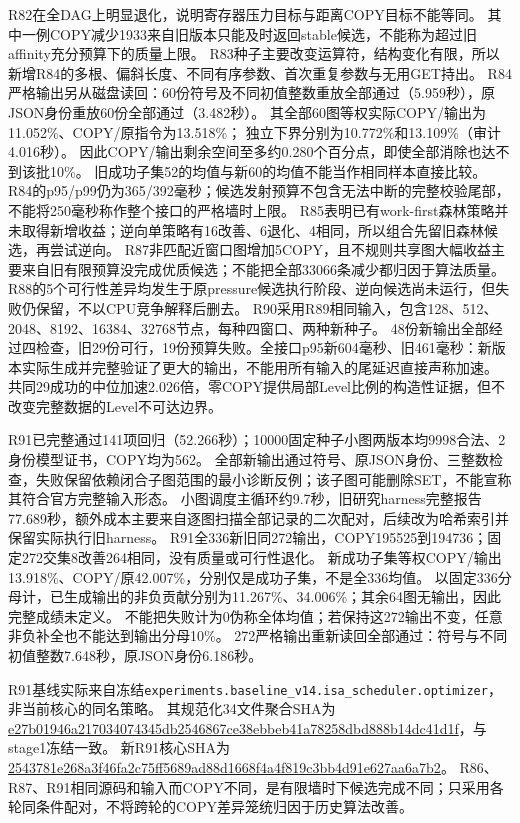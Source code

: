 \documentclass[UTF8,11pt,a4paper]{ctexart}
\begin{document}
R82在全DAG上明显退化，说明寄存器压力目标与距离COPY目标不能等同。
其中一例COPY减少1933来自旧版本只能及时返回stable候选，不能称为超过旧affinity充分预算下的质量上限。
R83种子主要改变运算符，结构变化有限，所以新增R84的多根、偏斜长度、不同有序参数、首次重复参数与无用GET持出。
R84严格输出另从磁盘读回：60份符号及不同初值整数重放全部通过（5.959秒），原JSON身份重放60份全部通过（3.482秒）。
其全部60图等权实际COPY/输出为11.052\%、COPY/原指令为13.518\%；
独立下界分别为10.772\%和13.109\%（审计4.016秒）。
因此COPY/输出剩余空间至多约0.280个百分点，即使全部消除也达不到该批10\%。
旧成功子集52的均值与新60的均值不能当作相同样本直接比较。
R84的p95/p99仍为365/392毫秒；候选发射预算不包含无法中断的完整校验尾部，不能将250毫秒称作整个接口的严格墙时上限。
R85表明已有work-first森林策略并未取得新增收益；逆向单策略有16改善、6退化、4相同，所以组合先留旧森林候选，再尝试逆向。
R87非匹配近窗口图增加5COPY，且不规则共享图大幅收益主要来自旧有限预算没完成优质候选；不能把全部33066条减少都归因于算法质量。
R88的5个可行性差异均发生于原pressure候选执行阶段、逆向候选尚未运行，但失败仍保留，不以CPU竞争解释后删去。
R90采用R89相同输入，包含128、512、2048、8192、16384、32768节点，每种四窗口、两种新种子。
48份新输出全部经过四检查，旧29份可行，19份预算失败。全接口p95新604毫秒、旧461毫秒：新版本实际生成并完整验证了更大的输出，不能用所有输入的尾延迟直接声称加速。
共同29成功的中位加速2.026倍，零COPY提供局部Level比例的构造性证据，但不改变完整数据的Level不可达边界。

R91已完整通过141项回归（52.266秒）；10000固定种子小图两版本均9998合法、2身份模型证书，COPY均为562。
全部新输出通过符号、原JSON身份、三整数检查，失败保留依赖闭合子图范围的最小诊断反例；该子图可能删除SET，不能宣称其符合官方完整输入形态。
小图调度主循环约9.7秒，旧研究harness完整报告77.689秒，额外成本主要来自逐图扫描全部记录的二次配对，后续改为哈希索引并保留实际执行旧harness。
R91全336新旧同272输出，COPY195525到194736；固定272交集8改善264相同，没有质量或可行性退化。
新成功子集等权COPY/输出13.918\%、COPY/原42.007\%，分别仅是成功子集，不是全336均值。
以固定336分母计，已生成输出的非负贡献分别为11.267\%、34.006\%；其余64图无输出，因此完整成绩未定义。
不能把失败计为0伪称全体均值；若保持这272输出不变，任意非负补全也不能达到输出分母10\%。
272严格输出重新读回全部通过：符号与不同初值整数7.648秒，原JSON身份6.186秒。

R91基线实际来自冻结\texttt{experiments.baseline\_v14.isa\_scheduler.optimizer}，非当前核心的同名策略。
其规范化34文件聚合SHA为\url{e27b01946a217034074345db2546867ce38ebbeb41a78258dbd888b14dc41d1f}，与stage1冻结一致。
新R91核心SHA为\url{2543781e268a3f46fa2c75ff5689ad88d1668f4a4f819c3bb4d91e627aa6a7b2}。
R86、R87、R91相同源码和输入而COPY不同，是有限墙时下候选完成不同；只采用各轮同条件配对，不将跨轮的COPY差异笼统归因于历史算法改善。
\end{document}
